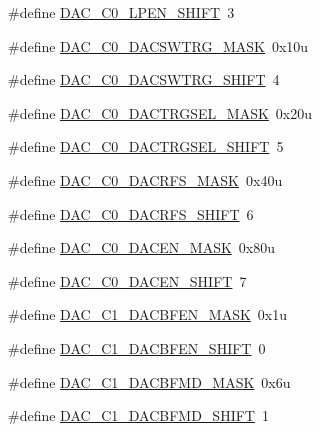 \begin{DoxyCompactItemize}
\item 
\#define \hyperlink{group___d_a_c___register___masks_ga97aaa812a3938df3559cb40b893db431}{D\+A\+C\+\_\+\+C0\+\_\+\+L\+P\+E\+N\+\_\+\+S\+H\+I\+FT}~3
\item 
\#define \hyperlink{group___d_a_c___register___masks_ga7e785d90fec3c1817fc53fea41f41644}{D\+A\+C\+\_\+\+C0\+\_\+\+D\+A\+C\+S\+W\+T\+R\+G\+\_\+\+M\+A\+SK}~0x10u
\item 
\#define \hyperlink{group___d_a_c___register___masks_ga25e2afd71ee5cc41adde6f072c9d2604}{D\+A\+C\+\_\+\+C0\+\_\+\+D\+A\+C\+S\+W\+T\+R\+G\+\_\+\+S\+H\+I\+FT}~4
\item 
\#define \hyperlink{group___d_a_c___register___masks_gac6dd81bc6500fc4b972c62bde339f31d}{D\+A\+C\+\_\+\+C0\+\_\+\+D\+A\+C\+T\+R\+G\+S\+E\+L\+\_\+\+M\+A\+SK}~0x20u
\item 
\#define \hyperlink{group___d_a_c___register___masks_ga32f43711fa193364231213bd67c989f4}{D\+A\+C\+\_\+\+C0\+\_\+\+D\+A\+C\+T\+R\+G\+S\+E\+L\+\_\+\+S\+H\+I\+FT}~5
\item 
\#define \hyperlink{group___d_a_c___register___masks_gadc1973eafb50599b83de95422477a1f5}{D\+A\+C\+\_\+\+C0\+\_\+\+D\+A\+C\+R\+F\+S\+\_\+\+M\+A\+SK}~0x40u
\item 
\#define \hyperlink{group___d_a_c___register___masks_ga495d0702c9899844340d198120a77e33}{D\+A\+C\+\_\+\+C0\+\_\+\+D\+A\+C\+R\+F\+S\+\_\+\+S\+H\+I\+FT}~6
\item 
\#define \hyperlink{group___d_a_c___register___masks_ga6865b52ae9a9275ef4db48eb3eb5d62a}{D\+A\+C\+\_\+\+C0\+\_\+\+D\+A\+C\+E\+N\+\_\+\+M\+A\+SK}~0x80u
\item 
\#define \hyperlink{group___d_a_c___register___masks_gae8835f0083d5a4e588402a32047e95cb}{D\+A\+C\+\_\+\+C0\+\_\+\+D\+A\+C\+E\+N\+\_\+\+S\+H\+I\+FT}~7
\item 
\#define \hyperlink{group___d_a_c___register___masks_ga61aa82d21d0c84ff4fe42d0856c506bd}{D\+A\+C\+\_\+\+C1\+\_\+\+D\+A\+C\+B\+F\+E\+N\+\_\+\+M\+A\+SK}~0x1u
\item 
\#define \hyperlink{group___d_a_c___register___masks_ga2062351429a9e737c0ac434488b59fe4}{D\+A\+C\+\_\+\+C1\+\_\+\+D\+A\+C\+B\+F\+E\+N\+\_\+\+S\+H\+I\+FT}~0
\item 
\#define \hyperlink{group___d_a_c___register___masks_ga28373e4d9ae322da4f6a37933a340b78}{D\+A\+C\+\_\+\+C1\+\_\+\+D\+A\+C\+B\+F\+M\+D\+\_\+\+M\+A\+SK}~0x6u
\item 
\#define \hyperlink{group___d_a_c___register___masks_ga779629844ed0967b310e7f2721c54624}{D\+A\+C\+\_\+\+C1\+\_\+\+D\+A\+C\+B\+F\+M\+D\+\_\+\+S\+H\+I\+FT}~1

\end{DoxyCompactItemize}
